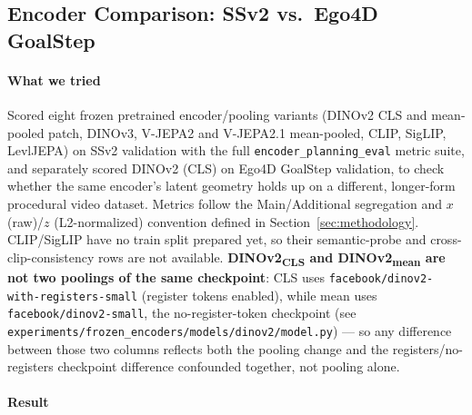 \subsection{Encoder Comparison: SSv2 vs.\ Ego4D GoalStep}
\label{exp:encoder-comparison-ssv2-ego4d}

\paragraph{What we tried} Scored eight frozen pretrained encoder/pooling variants
(DINOv2 CLS and mean-pooled patch, DINOv3, V-JEPA2 and V-JEPA2.1 mean-pooled, CLIP,
SigLIP, LevlJEPA) on SSv2 validation with the full \texttt{encoder\_planning\_eval}
metric suite, and separately scored DINOv2 (CLS) on Ego4D GoalStep validation, to check
whether the same encoder's latent geometry holds up on a different, longer-form
procedural video dataset. Metrics follow the Main/Additional segregation and $x$
(raw)/$z$ (L2-normalized) convention defined in Section~\ref{sec:methodology}.
CLIP/SigLIP have no train split prepared yet, so their semantic-probe and
cross-clip-consistency rows are not available. \textbf{DINOv2\textsubscript{CLS} and
DINOv2\textsubscript{mean} are not two poolings of the same checkpoint}: CLS uses
\texttt{facebook/dinov2-with-registers-small} (register tokens enabled), while mean uses
\texttt{facebook/dinov2-small}, the no-register-token checkpoint (see
\texttt{experiments/frozen\_encoders/models/dinov2/model.py}) --- so any difference
between those two columns reflects both the pooling change and the registers/no-registers
checkpoint difference confounded together, not pooling alone.

\paragraph{Result}

